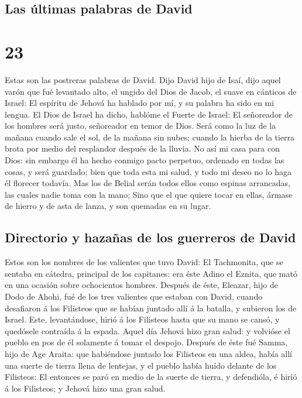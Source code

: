 \hypertarget{las-uxfaltimas-palabras-de-david}{%
\subsection{Las últimas palabras de
David}\label{las-uxfaltimas-palabras-de-david}}

\hypertarget{section-22}{%
\section{23}\label{section-22}}

 Estas son las postreras palabras de David. Dijo David
hijo de Isaí, dijo aquel varón que fué levantado alto, el ungido del
Dios de Jacob, el suave en cánticos de Israel:  El
espíritu de Jehová ha hablado por mí, y su palabra ha sido en mi lengua.
 El Dios de Israel ha dicho, hablóme el Fuerte de Israel:
El señoreador de los hombres será justo, señoreador en temor de Dios.
 Será como la luz de la mañana cuando sale el sol, de la
mañana sin nubes; cuando la hierba de la tierra brota por medio del
resplandor después de la lluvia.  No así mi casa para con
Dios: sin embargo él ha hecho conmigo pacto perpetuo, ordenado en todas
las cosas, y será guardado; bien que toda esta mi salud, y todo mi deseo
no lo haga él florecer todavía.  Mas los de Belial serán
todos ellos como espinas arrancadas, las cuales nadie toma con la mano;
 Sino que el que quiere tocar en ellas, ármase de hierro y
de asta de lanza, y son quemadas en su lugar.

\hypertarget{directorio-y-hazauxf1as-de-los-guerreros-de-david}{%
\subsection{Directorio y hazañas de los guerreros de
David}\label{directorio-y-hazauxf1as-de-los-guerreros-de-david}}

 Estos son los nombres de los valientes que tuvo David: El
Tachmonita, que se sentaba en cátedra, principal de los capitanes: era
éste Adino el Eznita, que mató en una ocasión sobre ochocientos hombres.
 Después de éste, Eleazar, hijo de Dodo de Ahohi, fué de
los tres valientes que estaban con David, cuando desafiaron á los
Filisteos que se habían juntado allí á la batalla, y subieron los de
Israel.  Este, levantándose, hirió á los Filisteos hasta
que su mano se cansó, y quedósele contraída á la espada. Aquel día
Jehová hizo gran salud: y volvióse el pueblo en pos de él solamente á
tomar el despojo.  Después de éste fué Samma, hijo de Age
Araita: que habiéndose juntado los Filisteos en una aldea, había allí
una suerte de tierra llena de lentejas, y el pueblo había huído delante
de los Filisteos:  El entonces se paró en medio de la
suerte de tierra, y defendióla, é hirió á los Filisteos; y Jehová hizo
una gran salud.

